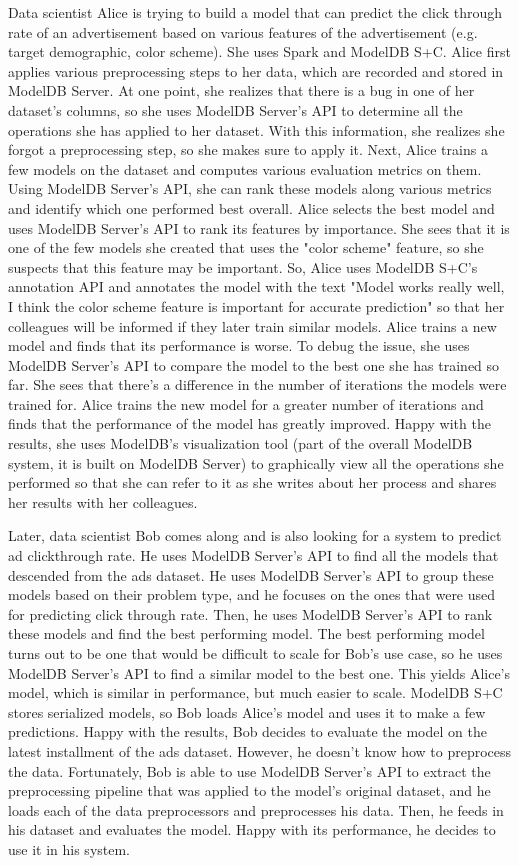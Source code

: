 Data scientist Alice is trying to build a model that can predict the click through rate
of an advertisement based on various features of the advertisement (e.g. target demographic,
color scheme). She uses Spark and ModelDB S+C. Alice first applies various preprocessing steps to
her data, which are recorded and stored in ModelDB Server. At one point, she realizes that there
is a bug in one of her dataset's columns, so she uses ModelDB Server's API to determine
all the operations she has applied to her dataset. With this information, she realizes she forgot a preprocessing step, so
she makes sure to apply it.
Next, Alice trains a few models on the dataset and computes various evaluation metrics on them. Using
ModelDB Server's API, she can rank these models along various metrics and identify which one performed
best overall. Alice selects the best model and uses ModelDB Server's API to 
rank its features by importance. She sees that it is one of the few 
models she created that uses the "color scheme" feature, so she suspects 
that this feature may be important. So, Alice uses ModelDB S+C's annotation API and 
annotates the model with the text "Model works really well, I think the color scheme feature is
important for accurate prediction" so that her colleagues will be informed if they later train
similar models. Alice trains a new model and finds that its performance
is worse. To debug the issue, she uses ModelDB Server's API to compare the model
to the best one she has trained so far. She sees that there's a difference in the number of iterations
the models were trained for. Alice trains the new model for a greater number of iterations and finds
that the performance of the model has greatly improved. Happy with the results, she uses ModelDB's visualization
tool (part of the overall ModelDB system, it is built on ModelDB Server) to graphically view all the operations 
she performed so that she can refer to it as she writes about her process and shares her results with her colleagues.

Later, data scientist Bob comes along and is also looking for a system to predict 
ad clickthrough rate. He uses ModelDB Server's API to find all the models that 
descended from the ads dataset. He uses ModelDB Server's API to group these models
based on their problem type, and he focuses on the ones that were used for predicting click
through rate. Then, he uses ModelDB Server's API to rank these models and find the best performing
model. The best performing model turns out to be one that would be difficult to scale for Bob's
use case, so he uses ModelDB Server's API to find a similar model to the best one. This yields
Alice's model, which is similar in performance, but much easier to scale. ModelDB S+C stores serialized models, so
Bob loads Alice's model and uses it to make a few predictions. Happy with the results, Bob
decides to evaluate the model on the latest installment of the ads dataset. However, he doesn't
know how to preprocess the data. Fortunately, Bob is able to use ModelDB Server's API to extract the 
preprocessing pipeline that was applied to the model's original dataset, and he loads each of
the data preprocessors and preprocesses his data. Then, he feeds in his dataset and evaluates
the model. Happy with its performance, he decides to use it in his system.

